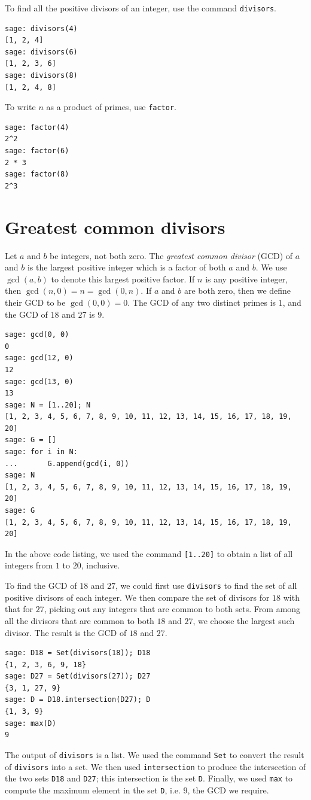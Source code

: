 To find all the positive divisors of an integer, use
the command \verb!divisors!.
%
\begin{lstlisting}
sage: divisors(4)
[1, 2, 4]
sage: divisors(6)
[1, 2, 3, 6]
sage: divisors(8)
[1, 2, 4, 8]
\end{lstlisting}
%
To write $n$ as a product of primes, use \verb!factor!.

\begin{lstlisting}
sage: factor(4)
2^2
sage: factor(6)
2 * 3
sage: factor(8)
2^3
\end{lstlisting}



\section{Greatest common divisors}

Let $a$ and $b$ be integers, not both zero. The
\emph{greatest common divisor}
(GCD) of $a$ and $b$ is the largest positive integer which
is a factor of both $a$ and $b$. We use $\gcd(a,b)$ to denote this
largest positive factor. If $n$ is any positive integer, then
$\gcd(n, 0) = n = \gcd(0, n)$. If $a$ and $b$ are both zero, then we
define their GCD to be $\gcd(0,0) = 0$. The GCD of any two
distinct primes is $1$, and the GCD of $18$ and $27$ is $9$.
%
\begin{lstlisting}
sage: gcd(0, 0)
0
sage: gcd(12, 0)
12
sage: gcd(13, 0)
13
sage: N = [1..20]; N
[1, 2, 3, 4, 5, 6, 7, 8, 9, 10, 11, 12, 13, 14, 15, 16, 17, 18, 19, 20]
sage: G = []
sage: for i in N:
...       G.append(gcd(i, 0))
sage: N
[1, 2, 3, 4, 5, 6, 7, 8, 9, 10, 11, 12, 13, 14, 15, 16, 17, 18, 19, 20]
sage: G
[1, 2, 3, 4, 5, 6, 7, 8, 9, 10, 11, 12, 13, 14, 15, 16, 17, 18, 19, 20]
\end{lstlisting}
%
In the above code listing, we used the command \verb![1..20]! to
obtain a list of all integers from $1$ to $20$, inclusive.

To find the GCD of $18$ and $27$, we could first use \verb!divisors!
to find the set of all positive divisors of each integer. We then
compare the set of divisors for $18$ with that for $27$, picking out
any integers that are common to both sets. From among all the divisors
that are common to both $18$ and $27$, we choose the largest such
divisor. The result is the GCD of $18$ and $27$.
%
\begin{lstlisting}
sage: D18 = Set(divisors(18)); D18
{1, 2, 3, 6, 9, 18}
sage: D27 = Set(divisors(27)); D27
{3, 1, 27, 9}
sage: D = D18.intersection(D27); D
{1, 3, 9}
sage: max(D)
9
\end{lstlisting}
%
The output of \verb!divisors! is a list. We used the command
\verb!Set! to convert the result of \verb!divisors! into a
set. We then used \verb!intersection! to produce
the intersection of the two sets \verb!D18! and \verb!D27!; this
intersection is the set \verb!D!. Finally, we used \verb!max! to
compute the maximum element in the set \verb!D!, i.e. $9$, the GCD we
require.

